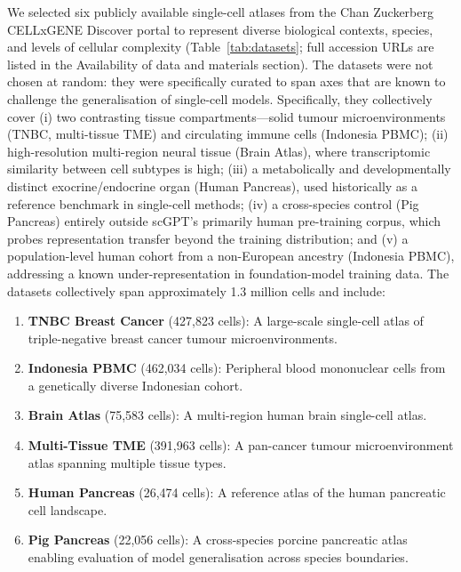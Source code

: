 \documentclass[11pt,a4paper]{article}
\makeatletter
\renewcommand\subsection{\@startsection{subsection}{2}{\z@}{-3.25ex plus -1ex minus -.2ex}{1.5ex plus .2ex}{\normalfont\normalsize\bfseries}}
\makeatother
\begin{document}
\subsection{Datasets}

We selected six publicly available single-cell atlases from the Chan Zuckerberg CELLxGENE Discover portal \citep{CZICELLxGENE2023} to represent diverse biological contexts, species, and levels of cellular complexity (Table~\ref{tab:datasets}; full accession URLs are listed in the Availability of data and materials section). The datasets were not chosen at random: they were specifically curated to span axes that are known to challenge the generalisation of single-cell models. Specifically, they collectively cover (i) two contrasting tissue compartments---solid tumour microenvironments (TNBC, multi-tissue TME) and circulating immune cells (Indonesia PBMC); (ii) high-resolution multi-region neural tissue (Brain Atlas), where transcriptomic similarity between cell subtypes is high; (iii) a metabolically and developmentally distinct exocrine/endocrine organ (Human Pancreas), used historically as a reference benchmark in single-cell methods; (iv) a cross-species control (Pig Pancreas) entirely outside scGPT's primarily human pre-training corpus, which probes representation transfer beyond the training distribution; and (v) a population-level human cohort from a non-European ancestry (Indonesia PBMC), addressing a known under-representation in foundation-model training data. The datasets collectively span approximately 1.3 million cells and include:

\begin{enumerate}
    \item \textbf{TNBC Breast Cancer} (427,823 cells): A large-scale single-cell atlas of triple-negative breast cancer tumour microenvironments.
    \item \textbf{Indonesia PBMC} (462,034 cells): Peripheral blood mononuclear cells from a genetically diverse Indonesian cohort.
    \item \textbf{Brain Atlas} (75,583 cells): A multi-region human brain single-cell atlas.
    \item \textbf{Multi-Tissue TME} (391,963 cells): A pan-cancer tumour microenvironment atlas spanning multiple tissue types.
    \item \textbf{Human Pancreas} (26,474 cells): A reference atlas of the human pancreatic cell landscape.
    \item \textbf{Pig Pancreas} (22,056 cells): A cross-species porcine pancreatic atlas enabling evaluation of model generalisation across species boundaries.
\end{enumerate}
\end{document}
